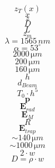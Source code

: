 \documentclass[a4paper,12t,BCOR12mm,toc=bibliography]{article}
\begin{document}
\begingroup
\fontsize{18pt}{15pt}\selectfont
$$z_{\si{T}}(x)$$
$$x$$
$$z$$
$$D$$
$$L$$
$$z_{\si{m}}$$
$$\lambda=1565\,\si{nm}$$
$$\alpha=53^\circ$$
$$2000\,\si{\micro m}$$
$$200\,\si{\micro m}$$
$$160\,\si{\micro m}$$
$$h$$
$$d_{\si{Beam}}$$
$$T_0\cdot h^5$$
$$\mathbf{p}$$
$$\mathbf{E}_{\si{rad}}$$
$$\mathbf{E}_{\si{M}}$$
$$R$$
$$\mathbf{E}_{\si{trap}}$$
$$\sim 140\,\si{\micro m}$$
$$\sim 1000\,\si{\micro m}$$
$$2\cdot w$$
$$D=\rho\cdot w$$
\endgroup
\end{document}
